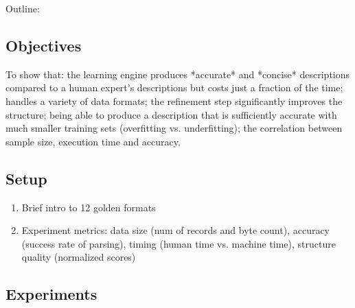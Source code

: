 Outline:

\subsection{Objectives}

To show that: the learning engine produces *accurate* and *concise* descriptions compared to a human
expert's descriptions but costs just a fraction of the time; handles a variety of data formats; the 
refinement step significantly improves the structure; being able to produce a description that is 
sufficiently accurate with much smaller training sets (overfitting vs. underfitting); the correlation
between sample size, execution time and accuracy.

\subsection{Setup}

\begin{enumerate}
\item Brief intro to 12 golden formats

\item Experiment metrics: data size (num of records and byte count), accuracy (success rate of parsing), 
timing (human time vs. machine time), structure quality (normalized scores)
\end{enumerate}

\subsection{Experiments}

